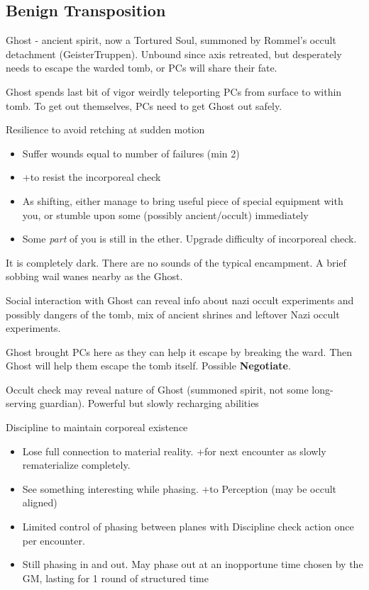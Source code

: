 \documentclass{book}
\newcommand{\df}{\DifficultyDie }
\newcommand{\stb}{\SetbackDie }
\newcommand{\ch}{\ChallengeDie }
\newcommand{\bbb}{\BoostDie }
\begin{document}
\begin{multicols}{2}
\section{Benign Transposition}

    Ghost - ancient spirit, now a Tortured Soul, summoned by Rommel's occult detachment (GeisterTruppen).  Unbound since axis retreated, but desperately needs to escape the warded tomb, or PCs will share their fate.

Ghost spends last bit of vigor weirdly teleporting PCs from surface to within tomb.  To get out themselves, PCs need to get Ghost out safely.

\ch\df Resilience to avoid retching at sudden motion
    \begin{itemize}
        \item \Failure Suffer wounds equal to number of failures (min 2)
        \item \Advantage +\bbb to resist the incorporeal check
        \item \Triumph As shifting, either manage to bring useful piece of special equipment with you, or stumble upon some (possibly ancient/occult) immediately
        \item \Despair Some \emph{part} of you is still in the ether.  Upgrade difficulty of incorporeal check.
    \end{itemize}


It is completely dark.  There are no sounds of the typical encampment.  A brief sobbing wail wanes nearby as the Ghost.

Social interaction with Ghost can reveal info about nazi occult experiments and possibly dangers of the tomb, mix of ancient shrines and leftover Nazi occult experiments.

    Ghost brought PCs here as they can help it escape by breaking the ward.  Then Ghost will help them escape the tomb itself.  Possible \textbf{Negotiate}.

    Occult check may reveal nature of Ghost (summoned spirit, not some long-serving guardian).  Powerful but slowly recharging abilities

\ch\df Discipline to maintain corporeal existence
    \begin{itemize}
        \item \Failure Lose full connection to material reality.  +\stb for next encounter as slowly rematerialize completely.
        \item \Advantage See something interesting while phasing.  +\bbb to Perception (may be occult aligned)
        \item \Triumph Limited control of phasing between planes with \df\df\df Discipline check action once per encounter.
        \item \Despair Still phasing in and out.  May phase out at an inopportune time chosen by the GM, lasting for 1 round of structured time
    \end{itemize}


\end{multicols}
\end{document}
